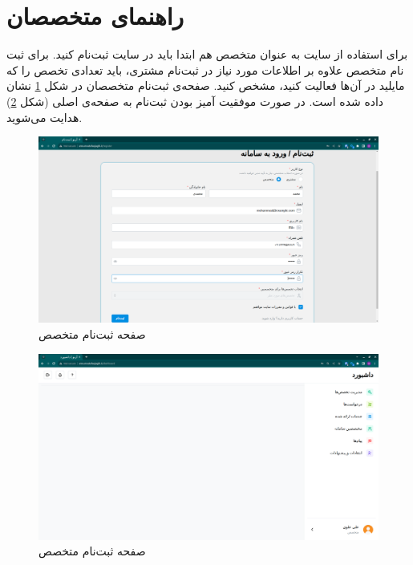 \FloatBarrier
\section{راهنمای متخصصان}

برای استفاده از سایت به عنوان متخصص هم ابتدا باید در سایت ثبت‌نام کنید.
برای ثبت نام متخصص علاوه بر اطلاعات مورد نیاز در ثبت‌نام مشتری، باید تعدادی تخصص را که مایلید در آن‌ها فعالیت کنید، مشخص کنید.
صفحه‌ی ثبت‌نام متخصصان در شکل \ref{specialist-signup} نشان داده شده است.
در صورت موفقیت آمیز بودن ثبت‌نام به صفحه‌ی اصلی (شکل \ref{specialist-dashboard}) هدایت می‌شوید.

\begin{figure}[h]
	\centering
	\includegraphics[width=\textwidth]{figs/user-guide/specialist-signup}
	\caption{صفحه ثبت‌نام متخصص}
	\label{specialist-signup}
\end{figure}

\begin{figure}[h]
	\centering
	\includegraphics[width=\textwidth]{figs/user-guide/specialist-dashboard}
	\caption{صفحه ثبت‌نام متخصص}
	\label{specialist-dashboard}
\end{figure}

